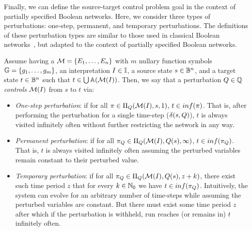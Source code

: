 Finally, we can define the source-target control problem goal in the context of partially specified Boolean networks. Here, we consider three types of perturbations: one-step, permanent, and temporary perturbations. The definitions of these perturbation types are similar to those used in classical Boolean networks~\cite{Su2019CMSB,Su2020}, but adapted to the context of partially specified Boolean networks.

\begin{definition}
\label{def:psbn_control}
Assume having a \PBN{} $\mathcal{M} = \{E_1, \ldots, E_n\}$ with $m$ nullary function symbols $\mathbb{G} = \{g_1, \ldots, g_m \}$, an interpretation $I \in \mathbb{I}$, a source state $s \in \mathbb{B}^n$, and a target state $t \in \mathbb{B}^n$ such that $t \in \bigcup \mathbb{A}(\mathcal{M}(I))$. Then, we say that a perturbation $Q \in \mathbb{Q}$ \emph{controls} $\mathcal{M}(I)$ from $s$ to $t$ via:

\begin{itemize}
	\item \emph{One-step perturbation}: if for all $\pi \in \Pi_{Q}(\mathcal{M}(I), s, 1)$, $t \in inf(\pi)$. That is, after performing the perturbation for a single time-step ($\delta(s, Q)$), $t$ is always visited infinitely often without further restricting the network in any way.
	\item \emph{Permanent perturbation}: if for all $\pi_{Q} \in \Pi_{Q}(\mathcal{M}(I), Q(s), \infty)$, $t \in inf(\pi_{Q})$. That is, $t$ is always visited infinitely often assuming the perturbed variables remain constant to their perturbed value.
	\item \emph{Temporary perturbation}: if for all $\pi_{Q} \in \Pi_{Q}(\mathcal{M}(I), Q(s), z+k)$, there exist such time period $z$ that for every $k \in \mathbb{N}_0$ we have $t \in inf(\pi_{Q})$. Intuitively, the system can evolve for an arbitrary number of time-steps while assuming the perturbed variables are constant. But there must exist some time period $z$ after which if the perturbation is withheld, run reaches (or remains in) $t$ infinitely often.
\end{itemize}

\end{definition}

